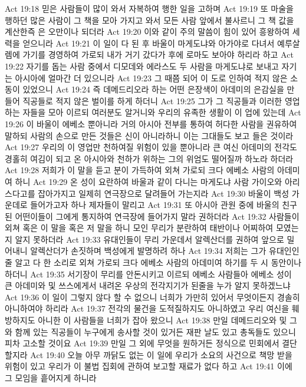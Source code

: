 Act 19:18  믿은 사람들이 많이 와서 자복하여 행한 일을 고하며
Act 19:19  또 마술을 행하던 많은 사람이 그 책을 모아 가지고 와서 모든 사람 앞에서 불사르니 그 책 값을 계산한즉 은 오만이나 되더라
Act 19:20  이와 같이 주의 말씀이 힘이 있어 흥왕하여 세력을 얻으니라
Act 19:21  이 일이 다 된 후 바울이 마게도냐와 아가야로 다녀서 예루살렘에 가기를 경영하여 가로되 내가 거기 갔다가 후에 로마도 보아야 하리라 하고
Act 19:22  자기를 돕는 사람 중에서 디모데와 에라스도 두 사람을 마게도냐로 보내고 자기는 아시아에 얼마간 더 있으니라
Act 19:23  그 때쯤 되어 이 도로 인하여 적지 않은 소동이 있었으니
Act 19:24  즉 데메드리오라 하는 어떤 은장색이 아데미의 은감실을 만들어 직공들로 적지 않은 벌이를 하게 하더니
Act 19:25  그가 그 직공들과 이러한 영업하는 자들을 모아 이르되 여러분도 알거니와 우리의 유족한 생활이 이 업에 있는데
Act 19:26  이 바울이 에베소 뿐아니라 거의 아시아 전부를 통하여 허다한 사람을 권유하여 말하되 사람의 손으로 만든 것들은 신이 아니라하니 이는 그대들도 보고 들은 것이라
Act 19:27  우리의 이 영업만 천하여질 위험이 있을 뿐아니라 큰 여신 아데미의 전각도 경홀히 여김이 되고 온 아시아와 천하가 위하는 그의 위엄도 떨어질까 하노라 하더라
Act 19:28  저희가 이 말을 듣고 분이 가득하여 외쳐 가로되 크다 에베소 사람의 아데미여 하니
Act 19:29  온 성이 요란하여 바울과 같이 다니는 마게도냐 사람 가이오와 아리스다고를 잡아가지고 일제히 연극장으로 달려들어 가는지라
Act 19:30  바울이 백성 가운데로 들어가고자 하나 제자들이 말리고
Act 19:31  또 아시아 관원 중에 바울의 친구된 어떤이들이 그에게 통지하여 연극장에 들어가지 말라 권하더라
Act 19:32  사람들이 외쳐 혹은 이 말을 혹은 저 말을 하니 모인 무리가 분란하여 태반이나 어찌하여 모였는지 알지 못하더라
Act 19:33  유대인들이 무리 가운데서 알렉산더를 권하여 앞으로 밀어내니 알렉산더가 손짓하며 백성에게 발명하려 하나
Act 19:34  저희는 그가 유대인인줄 알고 다 한 소리로 외쳐 가로되 크다 에베소 사람의 아데미여 하기를 두 시 동안이나 하더니
Act 19:35  서기장이 무리를 안돈시키고 이르되 에베소 사람들아 에베소 성이 큰 아데미와 및 쓰스에게서 내려온 우상의 전각지기가 된줄을 누가 알지 못하겠느냐
Act 19:36  이 일이 그렇지 않다 할 수 없으니 너희가 가만히 있어서 무엇이든지 경솔히 아니하여야 하리라
Act 19:37  전각의 물건을 도적질하지도 아니하였고 우리 여신을 훼방하지도 아니한 이 사람들을 너희가 잡아 왔으니
Act 19:38  만일 데메드리오와 및 그와 함께 있는 직공들이 누구에게 송사할 것이 있거든 재판 날도 있고 총독들도 있으니 피차 고소할 것이요
Act 19:39  만일 그 외에 무엇을 원하거든 정식으로 민회에서 결단할지라
Act 19:40  오늘 아무 까닭도 없는 이 일에 우리가 소요의 사건으로 책망 받을 위험이 있고 우리가 이 불법 집회에 관하여 보고할 재료가 없다 하고
Act 19:41  이에 그 모임을 흩어지게 하니라

